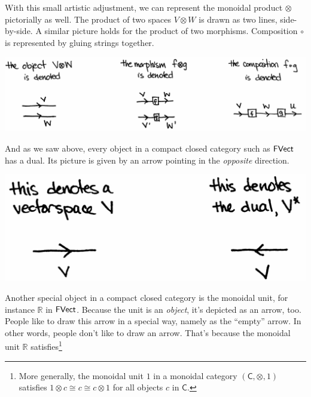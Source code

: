 \documentclass{tufte-handout-tai}
\newcommand{\cat}[1]{{\normalfont\textsf{#1}}}
\theoremstyle{plain}
\theoremstyle{definition}
\theoremstyle{remark}
\begin{document}
With this small artistic adjustment, we can represent the monoidal product $\otimes$ pictorially as well. The product of two spaces $V\otimes W$ is drawn as two lines, side-by-side. A similar picture holds for the product of two morphisms. Composition $\circ$ is represented by gluing strings together. 
\begin{center}
\includegraphics[width=!,totalheight=!,scale=0.5]{rules.jpg}
\end{center}
And as we saw above, every object in a compact closed category such as $\cat{FVect}$ has a dual. Its picture is given by an arrow pointing in the \textit{opposite} direction. 
\begin{center}
\includegraphics[width=!,totalheight=!,scale=0.5]{dual.jpg}
\end{center}
Another special object in a compact closed category is the monoidal unit, for instance $\mathbb{R}$ in $\cat{FVect}$. Because the unit is an \textit{object}, it's depicted as an arrow, too. People like to draw this arrow in a special way, namely as the ``empty'' arrow. In other words, people don't like to draw an arrow. That's because the monoidal unit $\mathbb{R}$ satisfies\footnote{More generally, the monoidal unit $1$ in a monoidal category $(\mathsf{C},\otimes,1)$ satisfies $1\otimes c\cong c \cong c\otimes 1$ for all objects $c$ in $\mathsf{C}$.}
\end{document}
